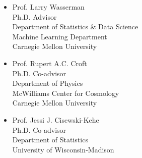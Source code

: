 \documentclass[letterpaper,10pt]{article}
\begin{document}
\begin{multicols}{2}
\begin{itemize}[leftmargin=0.6cm]

\item Prof. Larry Wasserman \\
Ph.D. Advisor \\
Department of Statistics \& Data Science \\
Machine Learning Department \\
Carnegie Mellon University \\

\item Prof. Rupert A.C. Croft\\
Ph.D. Co-advisor\\
Department of Physics\\
McWilliams Center for Cosmology\\
Carnegie Mellon University\\
\end{itemize}
\end{multicols}

\vspace{-0.5cm}

\begin{itemize}[leftmargin=0.6cm]
\item Prof. Jessi J. Cisewski-Kehe\\
Ph.D. Co-advisor\\
Department of Statistics\\
University of Wisconsin-Madison\\

\end{itemize}
\end{document}
